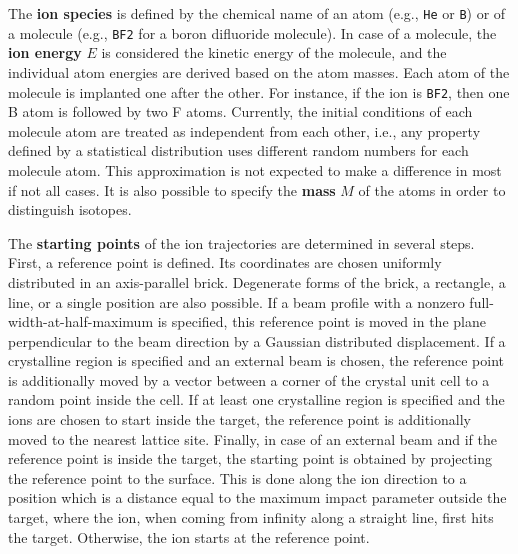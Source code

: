 The \textbf{ion species} is defined by the chemical name of an atom (e.g.,
\texttt{He} or \texttt{B}) or of a molecule (e.g., \texttt{BF2} for a
boron difluoride molecule). In case of a molecule, the \textbf{ion energy} $E$
is considered the kinetic energy of the molecule, and the individual atom 
energies are derived based on the atom masses. Each atom of the molecule is
implanted one after the other. For instance, if the ion is \texttt{BF2}, then one
B atom is followed by two F atoms. Currently, the initial conditions of each 
molecule atom are treated as independent from each other, i.e., any property 
defined by a statistical distribution uses different random numbers for each 
molecule atom. This approximation is not expected to make a difference in
most if not all cases. It is also possible to specify the \textbf{mass} $M$ 
of the atoms in order to distinguish isotopes.

The \textbf{starting points} of the ion trajectories are determined in several
steps. First, a reference point is defined. Its coordinates are chosen uniformly
distributed in an axis-parallel brick. Degenerate forms of the brick, a
rectangle, a line, or a single position are also possible. If a beam profile
with a nonzero full-width-at-half-maximum is specified, this reference point is
moved in the plane perpendicular to the beam direction by a Gaussian distributed
displacement. If a crystalline region is specified and an external beam is
chosen, the reference point is additionally moved by a vector between a corner
of the crystal unit cell to a random point inside the cell. If at least one
crystalline region is specified and the ions are chosen to start inside the
target, the reference point is additionally moved to the nearest lattice site. 
Finally, in case of an external beam and if the reference point is inside the
target, the starting point is obtained by projecting the reference point to the
surface. This is done along the ion direction to a position which is a
distance equal to the maximum impact parameter outside the target, where the
ion, when coming from infinity along a straight line, first hits the target.
Otherwise, the ion starts at the reference point. 


